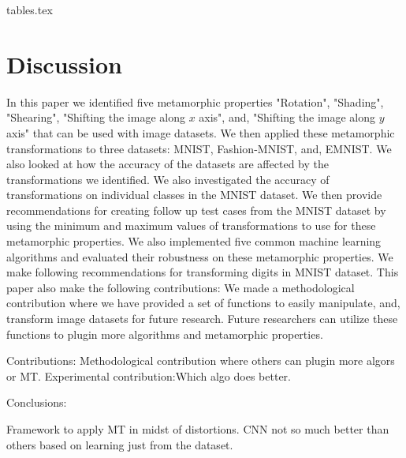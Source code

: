 {tables.tex}

\newpage
\section{Discussion}
In this paper we identified five metamorphic properties "Rotation", "Shading", "Shearing", "Shifting the image along $x$ axis", and, "Shifting the image along $y$ axis" that can be used with image datasets. We then applied these metamorphic transformations to three datasets: MNIST, Fashion-MNIST, and, EMNIST. We also looked at how the accuracy of the datasets are affected by the transformations we identified. We also investigated the accuracy of transformations on individual classes in the MNIST dataset. We then provide recommendations for creating follow up test cases from the MNIST dataset by using the minimum and maximum values of transformations to use for these metamorphic properties. We also implemented five common machine learning algorithms and evaluated their robustness on these metamorphic properties.
We make following recommendations for transforming digits in MNIST dataset.
This paper also make the following contributions: 
We made a methodological contribution where we have provided a set of functions to easily manipulate, and, transform image datasets for future research. Future researchers can utilize these functions to plugin more algorithms and metamorphic properties.

Contributions:
Methodological contribution where others can plugin more algors or MT.
Experimental contribution:Which algo does better.


Conclusions:

Framework to apply MT in midst of distortions.
CNN not so much better than others based on learning just from the dataset.

